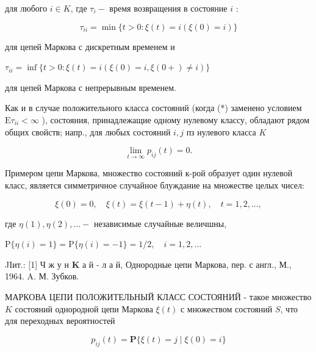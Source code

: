 \documentclass[10pt]{article}
\begin{document}
для любого $i \in K$, где $\tau_{i}-$ время возвращения в состояние $i$ :



\[

\tau_{i i}=\min \{t>0: \xi(t)=i(\xi(0)=i)\}

\]



для цепей Маркова с дискретным временем и



$\tau_{i i}=\inf \{t>0: \xi(t)=i(\xi(0)=i, \xi(0+) \neq i)\}$



для цепей Маркова с непрерывным временем.



Как и в случае положительного класса состояний (когда (*) заменено условием $\mathrm{E} \tau_{i i}<\infty$ ), состояния, принадлежащие одному нулевому классу, обладают рядом общих свойств; напр., для любых состояний $i, j$ пз нулевого класса $K$



\[

\lim _{t \rightarrow \infty} p_{i j}(t)=0 .

\]



Примером цепи Маркова, множество состояний к-рой образует один нулевой класс, является симметричное случайное блуждание на множестве целых чисел:



\[

\xi(0)=0, \quad \xi(t)=\xi(t-1)+\eta(t), \quad t=1,2, \ldots,

\]



где $\eta(1), \eta(2), \ldots-$ независимые случайные величшны,



$\mathrm{P}\{\eta(i)=1\}=\mathrm{P}\{\eta(i)=-1\}=1 / 2, \quad i=1,2, \ldots$



JIит.: [1] Ч ж у н $\mathbf{K}$ а й - л а й, Однородные цепи Маркова, пер. с англ., М., 1964. A. М. Зубков.



МАРКОВА ЦЕПИ ПОЛОЖИТЕЛЬНЫЙ КЛАСС СОСТОЯНИЙ - такое множество $K$ состояний однородной цепи Маркова $\xi(t)$ с множеством состояний $S$, что для переходных вероятностей



\[

p_{i j}(t)=\mathbf{P}\{\xi(t)=j \mid \xi(0)=i\}

\]
\end{document}
